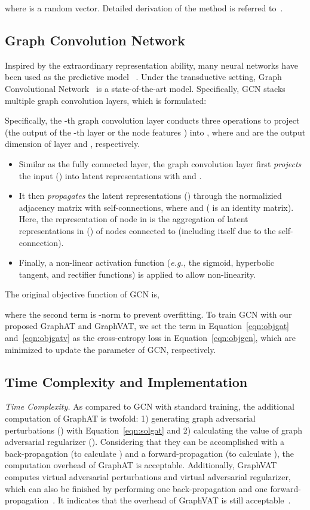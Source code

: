 \documentclass[10pt,journal,compsoc]{IEEEtran}
\newcommand{\eg}{\emph{e.g., }}
\begin{document}
where  is a random vector. 
Detailed derivation of the method is referred to~\cite{miyato2018virtual}.

\subsection{Graph Convolution Network}
Inspired by the extraordinary representation ability, many neural networks have been used as the predictive model ~\cite{wang2016structural,kipf2017semi,ni2018co,velickovic2018graph}. Under the transductive setting, Graph Convolutional Network~\cite{kipf2017semi} is a state-of-the-art model. Specifically, GCN stacks multiple graph convolution layers, which is formulated:

Specifically, the -th graph convolution layer conducts three operations to project  (the output of the -th layer or the node features ) into , where  and  are the output dimension of layer  and , respectively. 
\begin{itemize}[leftmargin=*]
	\item Similar as the fully connected layer, the graph convolution layer first \textit{projects} the input () into latent representations with  and . 
	\item It then \textit{propagates} the latent representations () through the normalizied adjacency matrix  with self-connections, where  and  ( is an identity matrix). Here, the representation of node  in  is the aggregation of latent representations in () of nodes connected to  (including itself due to the self-connection). \item Finally, a non-linear activation function  (\eg the sigmoid, hyperbolic tangent, and rectifier functions) is applied to allow non-linearity.
\end{itemize}

The original objective function of GCN is,

where the second term is -norm to prevent overfitting. To train GCN with our proposed GraphAT and GraphVAT, we set the  term in Equation~\ref{eqn:objgat} and~\ref{eqn:objgatv} as the cross-entropy loss in Equation~\ref{eqn:objgcn}, which are minimized to update the parameter of GCN, respectively. 

\subsection{Time Complexity and Implementation}
\label{ss:time_comp}
\textit{Time Complexity.} As compared to GCN with standard training, the additional computation of GraphAT is twofold: 1) generating graph adversarial perturbations () with Equation~\ref{eqn:solgat} and 2) calculating the value of graph adversarial regularizer (). Considering that they can be accomplished with a back-propagation (to calculate ) and a forward-propagation (to calculate ), the computation overhead of GraphAT is acceptable. Additionally, GraphVAT computes virtual adversarial perturbations and virtual adversarial regularizer, which can also be finished by performing 
one back-propagation and one forward-propagation~\cite{miyato2018virtual}. It indicates that the overhead of GraphVAT is still acceptable~\cite{miyato2018virtual}.
\end{document}
